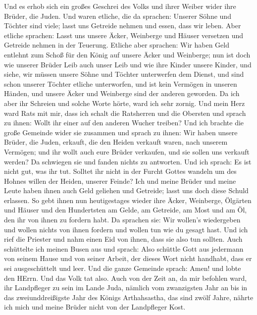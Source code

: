  Und es erhob sich ein großes Geschrei des Volks und ihrer
Weiber wider ihre Brüder, die Juden.  Und waren etliche,
die da sprachen: Unserer Söhne und Töchter sind viele; lasst uns
Getreide nehmen und essen, dass wir leben.  Aber etliche
sprachen: Lasst uns unsere Äcker, Weinberge und Häuser versetzen und
Getreide nehmen in der Teuerung.  Etliche aber sprachen:
Wir haben Geld entlehnt zum Schoß für den König auf unsere Äcker und
Weinberge;  nun ist doch wie unserer Brüder Leib auch
unser Leib und wie ihre Kinder unsere Kinder, und siehe, wir müssen
unsere Söhne und Töchter unterwerfen dem Dienst, und sind schon unserer
Töchter etliche unterworfen, und ist kein Vermögen in unseren Händen,
und unsere Äcker und Weinberge sind der anderen geworden. 
Da ich aber ihr Schreien und solche Worte hörte, ward ich sehr zornig.
 Und mein Herz ward Rats mit mir, dass ich schalt die
Ratsherren und die Obersten und sprach zu ihnen: Wollt ihr einer auf den
anderen Wucher treiben? Und ich brachte die große Gemeinde wider sie
zusammen  und sprach zu ihnen: Wir haben unsere Brüder,
die Juden, erkauft, die den Heiden verkauft waren, nach unserem
Vermögen; und ihr wollt auch eure Brüder verkaufen, und sie sollen uns
verkauft werden? Da schwiegen sie und fanden nichts zu antworten.
 Und ich sprach: Es ist nicht gut, was ihr tut. Solltet
ihr nicht in der Furcht Gottes wandeln um des Hohnes willen der Heiden,
unserer Feinde?  Ich und meine Brüder und meine Leute
haben ihnen auch Geld geliehen und Getreide; lasst uns doch diese Schuld
erlassen.  So gebt ihnen nun heutigestages wieder ihre
Äcker, Weinberge, Ölgärten und Häuser und den Hundertsten am Gelde, am
Getreide, am Most und am Öl, den ihr von ihnen zu fordern habt.
 Da sprachen sie: Wir wollen's wiedergeben und wollen
nichts von ihnen fordern und wollen tun wie du gesagt hast. Und ich rief
die Priester und nahm einen Eid von ihnen, dass sie also tun sollten.
 Auch schüttelte ich meinen Busen aus und sprach: Also
schüttle Gott aus jedermann von seinem Hause und von seiner Arbeit, der
dieses Wort nicht handhabt, dass er sei ausgeschüttelt und leer. Und die
ganze Gemeinde sprach: Amen! und lobte den HErrn. Und das Volk tat also.
 Auch von der Zeit an, da mir befohlen ward, ihr
Landpfleger zu sein im Lande Juda, nämlich vom zwanzigsten Jahr an bis
in das zweiunddreißigste Jahr des Königs Arthahsastha, das sind zwölf
Jahre, nährte ich mich und meine Brüder nicht von der Landpfleger Kost.
